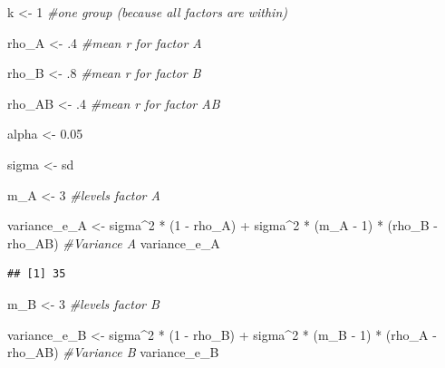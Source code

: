 \documentclass[
]{book}
\newenvironment{Shaded}{\begin{snugshade}}{\end{snugshade}}
\newcommand{\CommentTok}[1]{\textcolor[rgb]{0.56,0.35,0.01}{\textit{#1}}}
\newcommand{\DecValTok}[1]{\textcolor[rgb]{0.00,0.00,0.81}{#1}}
\newcommand{\FloatTok}[1]{\textcolor[rgb]{0.00,0.00,0.81}{#1}}
\newcommand{\NormalTok}[1]{#1}
\newcommand{\OtherTok}[1]{\textcolor[rgb]{0.56,0.35,0.01}{#1}}
\newcommand{\SpecialCharTok}[1]{\textcolor[rgb]{0.00,0.00,0.00}{#1}}
\begin{document}
\begin{Shaded}
\begin{Highlighting}[]
\NormalTok{k }\OtherTok{\textless{}{-}} \DecValTok{1} \CommentTok{\#one group (because all factors are within)}

\NormalTok{rho\_A }\OtherTok{\textless{}{-}}\NormalTok{ .}\DecValTok{4} \CommentTok{\#mean r for factor A}

\NormalTok{rho\_B }\OtherTok{\textless{}{-}}\NormalTok{ .}\DecValTok{8} \CommentTok{\#mean r for factor B}

\NormalTok{rho\_AB }\OtherTok{\textless{}{-}}\NormalTok{ .}\DecValTok{4} \CommentTok{\#mean r for factor AB}

\NormalTok{alpha }\OtherTok{\textless{}{-}} \FloatTok{0.05}

\NormalTok{sigma }\OtherTok{\textless{}{-}}\NormalTok{ sd}

\NormalTok{m\_A }\OtherTok{\textless{}{-}} \DecValTok{3} \CommentTok{\#levels factor A}

\NormalTok{variance\_e\_A }\OtherTok{\textless{}{-}}\NormalTok{ sigma}\SpecialCharTok{\^{}}\DecValTok{2} \SpecialCharTok{*}\NormalTok{ (}\DecValTok{1} \SpecialCharTok{{-}}\NormalTok{ rho\_A) }\SpecialCharTok{+} 
\NormalTok{  sigma}\SpecialCharTok{\^{}}\DecValTok{2} \SpecialCharTok{*}\NormalTok{ (m\_A }\SpecialCharTok{{-}} \DecValTok{1}\NormalTok{) }\SpecialCharTok{*}\NormalTok{ (rho\_B }\SpecialCharTok{{-}}\NormalTok{ rho\_AB) }
\CommentTok{\#Variance A}
\NormalTok{variance\_e\_A}
\end{Highlighting}
\end{Shaded}

\begin{verbatim}
## [1] 35
\end{verbatim}

\begin{Shaded}
\begin{Highlighting}[]
\NormalTok{m\_B }\OtherTok{\textless{}{-}} \DecValTok{3} \CommentTok{\#levels factor B}

\NormalTok{variance\_e\_B }\OtherTok{\textless{}{-}}\NormalTok{ sigma}\SpecialCharTok{\^{}}\DecValTok{2} \SpecialCharTok{*}\NormalTok{ (}\DecValTok{1} \SpecialCharTok{{-}}\NormalTok{ rho\_B) }\SpecialCharTok{+} 
\NormalTok{  sigma}\SpecialCharTok{\^{}}\DecValTok{2} \SpecialCharTok{*}\NormalTok{ (m\_B }\SpecialCharTok{{-}} \DecValTok{1}\NormalTok{) }\SpecialCharTok{*}\NormalTok{ (rho\_A }\SpecialCharTok{{-}}\NormalTok{ rho\_AB)}
\CommentTok{\#Variance B}
\NormalTok{variance\_e\_B}
\end{Highlighting}
\end{Shaded}
\end{document}
